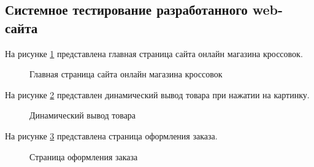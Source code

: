 \renewcommand{\arraystretch}{1.0} %


\subsection{Системное тестирование разработанного web-сайта}

На рисунке \ref{main:Главная} представлена главная страница сайта онлайн магазина кроссовок.

\begin{figure}[H] %
\caption{Главная страница сайта онлайн магазина кроссовок}
\label{main:Главная}
\end{figure}


На рисунке \ref{menu:Вывод} представлен динамический вывод товара при нажатии на картинку.
\begin{figure}[ht]
\caption{Динамический вывод товара}
\label{menu:Вывод}
\end{figure}

\newpage
На рисунке \ref{enter:Заказ} представлена страница оформления заказа.
\begin{figure}[ht]
\caption{Страница оформления заказа}
\label{enter:Заказ}
\end{figure}

